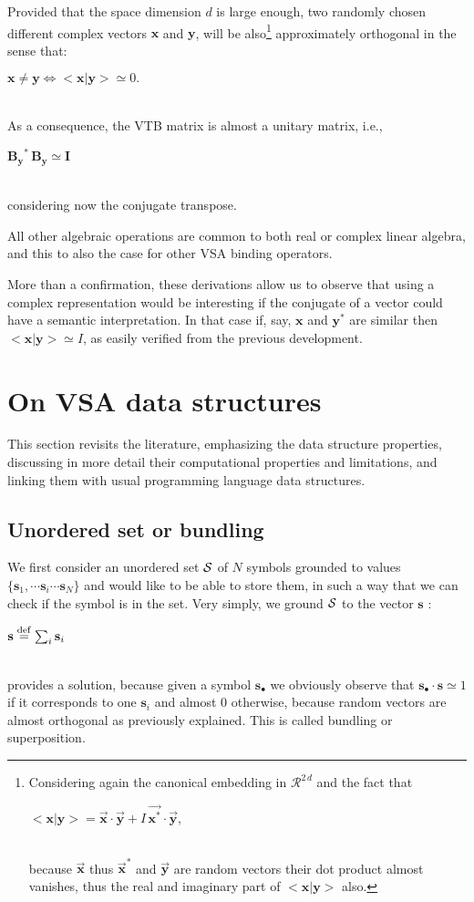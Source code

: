 \documentclass[sn-mathphys]{sn-jnl}
\newcommand{\defq}{\stackrel {\rm def}{=}}
\newcommand{\eqline}[1]{~\vspace{0.1cm}\\\centerline{$#1$}\vspace{0.1cm}\\}
\begin{document}
\begin{appendices}
Provided that the space dimension $d$ is large enough, two randomly chosen different complex vectors $\mathbf{x}$ and $\mathbf{y}$, will be also\footnote{
Considering again the canonical embedding in ${\mathcal R}^{2\,d}$ and the fact that
\eqline{<\mathbf{x} \vert \mathbf{y}> = \overrightarrow{\mathbf{x}} \cdot \overrightarrow{\mathbf{y}} + I \, 
  \overrightarrow{\mathbf{x}^*} \cdot \overrightarrow{\mathbf{y}},}
because $\overrightarrow{\mathbf{x}}$ thus $\overrightarrow{\mathbf{x}}^*$ and $\overrightarrow{\mathbf{y}}$ are random vectors their dot product almost vanishes, thus the real and imaginary part of $<\mathbf{x} \vert \mathbf{y}>$ also.} approximately orthogonal in the sense that:
\eqline{\mathbf{x} \neq \mathbf{y} \Leftrightarrow <\mathbf{x} \vert \mathbf{y}> \simeq 0.}
As a consequence, the VTB matrix is almost a unitary matrix, i.e., 
\eqline{\mathbf{B_y}^* \, \mathbf{B_y} \simeq \mathbf{I}}
considering now the conjugate transpose.

All other algebraic operations are common to both real or complex linear algebra, and this to also the case for other VSA binding operators.

More than a confirmation, these derivations allow us to observe that using a complex representation would be interesting if the conjugate of a vector could have a semantic interpretation. In that case if, say, $\mathbf{x}$ and $\mathbf{y}^*$ are similar then $<\mathbf{x} \vert \mathbf{y}> \simeq I$, as easily verified from the previous development. 

\section{On VSA data structures} \label{data-structure}

This section revisits the literature, emphasizing the data structure properties, discussing in more detail their computational properties and limitations, and linking them with usual programming language data structures.

\subsection{Unordered set or bundling}

We first consider an unordered set ${\cal S}$ of $N$ symbols grounded to values $\{\mathbf{s}_1, \cdots \mathbf{s}_i \cdots \mathbf{s}_N\}$ and would like to be able to store them, in such a way that we can check if the symbol is in the set. Very simply, we ground ${\cal S}$ to the vector $\mathbf{s}$ :
\eqline{\mathbf{s} \defq \sum_i \mathbf{s}_i}
provides a solution, because given a symbol $\mathbf{s}_\bullet$ we obviously observe that $\mathbf{s}_\bullet \cdot \mathbf{s} \simeq 1$ if it corresponds to one $\mathbf{s}_i$ and almost $0$ otherwise, because random vectors are almost orthogonal as previously explained. This is called bundling \cite{schlegel_comparison_2020} or superposition.


\end{appendices}
\end{document}
